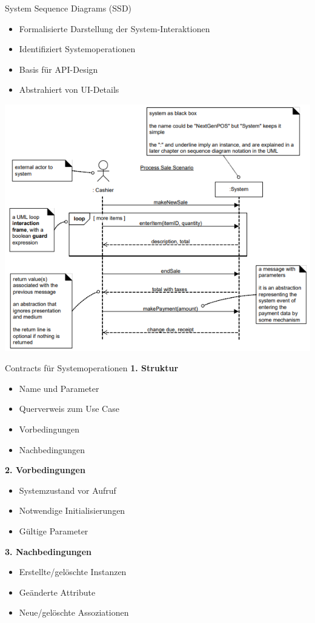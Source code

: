 \begin{concept}{System Sequence Diagrams (SSD)}
\begin{itemize}
    \item Formalisierte Darstellung der System-Interaktionen
    \item Identifiziert Systemoperationen
    \item Basis für API-Design
    \item Abstrahiert von UI-Details
\end{itemize}
\includegraphics[width=\linewidth]{images/ssd.png}
\end{concept}

\begin{KR}{Contracts für Systemoperationen}
\textbf{1. Struktur}
\begin{itemize}
    \item Name und Parameter
    \item Querverweis zum Use Case
    \item Vorbedingungen
    \item Nachbedingungen
\end{itemize}

\textbf{2. Vorbedingungen}
\begin{itemize}
    \item Systemzustand vor Aufruf
    \item Notwendige Initialisierungen
    \item Gültige Parameter
\end{itemize}

\textbf{3. Nachbedingungen}
\begin{itemize}
    \item Erstellte/gelöschte Instanzen
    \item Geänderte Attribute
    \item Neue/gelöschte Assoziationen
\end{itemize}
\end{KR}

